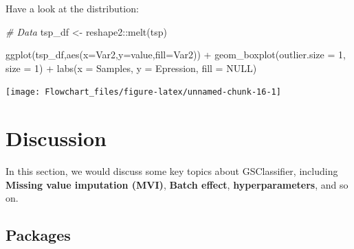 \documentclass[
  12pt,
]{book}
\newenvironment{Shaded}{\begin{snugshade}}{\end{snugshade}}
\newcommand{\AttributeTok}[1]{\textcolor[rgb]{0.77,0.63,0.00}{#1}}
\newcommand{\CommentTok}[1]{\textcolor[rgb]{0.56,0.35,0.01}{\textit{#1}}}
\newcommand{\ConstantTok}[1]{\textcolor[rgb]{0.00,0.00,0.00}{#1}}
\newcommand{\DecValTok}[1]{\textcolor[rgb]{0.00,0.00,0.81}{#1}}
\newcommand{\FunctionTok}[1]{\textcolor[rgb]{0.00,0.00,0.00}{#1}}
\newcommand{\NormalTok}[1]{#1}
\newcommand{\OtherTok}[1]{\textcolor[rgb]{0.56,0.35,0.01}{#1}}
\newcommand{\SpecialCharTok}[1]{\textcolor[rgb]{0.00,0.00,0.00}{#1}}
\newcommand{\StringTok}[1]{\textcolor[rgb]{0.31,0.60,0.02}{#1}}
\begin{document}
Have a look at the distribution:

\begin{Shaded}
\begin{Highlighting}[]

\CommentTok{\# Data}
\NormalTok{tsp\_df }\OtherTok{\textless{}{-}}\NormalTok{ reshape2}\SpecialCharTok{::}\FunctionTok{melt}\NormalTok{(tsp)}

\FunctionTok{ggplot}\NormalTok{(tsp\_df,}\FunctionTok{aes}\NormalTok{(}\AttributeTok{x=}\NormalTok{Var2,}\AttributeTok{y=}\NormalTok{value,}\AttributeTok{fill=}\NormalTok{Var2)) }\SpecialCharTok{+} 
      \FunctionTok{geom\_boxplot}\NormalTok{(}\AttributeTok{outlier.size =} \DecValTok{1}\NormalTok{, }\AttributeTok{size =} \DecValTok{1}\NormalTok{) }\SpecialCharTok{+} 
      \FunctionTok{labs}\NormalTok{(}\AttributeTok{x =} \StringTok{\textquotesingle{}Samples\textquotesingle{}}\NormalTok{,}
           \AttributeTok{y =} \StringTok{\textquotesingle{}Epression\textquotesingle{}}\NormalTok{,}
           \AttributeTok{fill =} \ConstantTok{NULL}\NormalTok{) }
\end{Highlighting}
\end{Shaded}

\begin{center}\texttt{[image: Flowchart\_files/figure-latex/unnamed-chunk-16-1]} \end{center}

\hypertarget{discussion}{%
\chapter{Discussion}\label{discussion}}

In this section, we would discuss some key topics about GSClassifier, including \textbf{Missing value imputation (MVI)}, \textbf{Batch effect}, \textbf{hyperparameters}, and so on.

\hypertarget{packages-1}{%
\section{Packages}\label{packages-1}}
\end{document}
